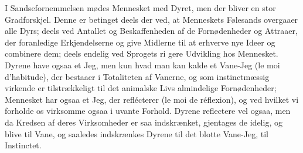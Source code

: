 \documentclass[12pt,a4paper]{book}
\begin{document}
I Sandsefornemmelsen mødes Mennesket med Dyret, men
der bliver en stor Gradforskjel. Denne er betinget deels der\-%
ved, at Menneskets Følesands overgaaer alle Dyrs; deels ved
Antallet og Beskaffenheden af de Fornødenheder og Attraaer,
der foranledige Erkjendelserne og give Midlerne til at erhverve
nye Ideer og combinere dem; deels endelig ved Sprogets ri\-%
gere Udvikling hos Mennesket. Dyrene have ogsaa et Jeg,
men kun hvad man kan kalde et Vane-Jeg (le moi d'habitude),
der bestaaer i Totaliteten af Vanerne, og som instinctmæssig
virkende er tilstrækkeligt til det animalske Livs almindelige
Fornødenheder; Mennesket har ogsaa et Jeg, der reflécterer
(le moi de réflexion), og ved hvilket vi forholde os virksomme
ogsaa i uvante Forhold. Dyrene reflectere vel ogsaa, men da
Kredsen af deres Virksomheder er saa indskrænket, gjentages
de idelig, og blive til Vane, og saaledes indskrænkes Dyrene
til det blotte Vane-Jeg, til Instinctet.
\end{document}
